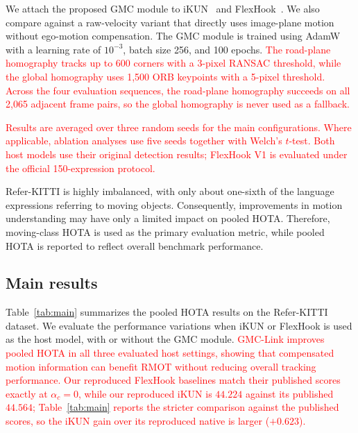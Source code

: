 \documentclass{article}
\begin{document}
We attach the proposed GMC module to iKUN~\cite{ikun} and FlexHook~\cite{flexhook}. We also compare against a raw-velocity variant that directly uses image-plane motion without ego-motion compensation. The GMC module is trained using AdamW\textcolor{red}{~\cite{adamw}} with a learning rate of $10^{-3}$, batch size 256, and 100 epochs. \textcolor{red}{The road-plane homography tracks up to 600 corners with a 3-pixel RANSAC threshold, while the global homography uses 1,500 ORB keypoints with a 5-pixel threshold. Across the four evaluation sequences, the road-plane homography succeeds on all 2,065 adjacent frame pairs, so the global homography is never used as a fallback.}

\textcolor{red}{Results are averaged over three random seeds for the main configurations. Where applicable, ablation analyses use five seeds together with Welch's $t$-test. Both host models use their original detection results; FlexHook V1 is evaluated under the official 150-expression protocol.}


Refer-KITTI is highly imbalanced, with only about one-sixth of the language expressions referring to moving objects. Consequently, improvements in motion understanding may have only a limited impact on pooled HOTA. Therefore, moving-class HOTA is used as the primary evaluation metric, while pooled HOTA is reported to reflect overall benchmark performance.

\subsection{Main results}
\label{sec:main}
Table~\ref{tab:main} summarizes the pooled HOTA results on the Refer-KITTI dataset. We evaluate the performance variations when iKUN or FlexHook is used as the host model, with or without the GMC module. \textcolor{red}{GMC-Link improves pooled HOTA in all three evaluated host settings, showing that compensated motion information can benefit RMOT without reducing overall tracking performance.}
\textcolor{red}{Our reproduced FlexHook baselines match their published scores exactly at $\alpha_c{=}0$, while our reproduced iKUN is $44.224$ against its published $44.564$; Table~\ref{tab:main} reports the stricter comparison against the published scores, so the iKUN gain over its reproduced native is larger ($+0.623$).}
\end{document}
